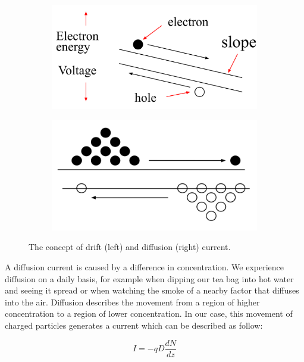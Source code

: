 \begin{figure}
\centering
\begin{subfigure}{.5\textwidth}
  \centering
  \includegraphics[width=\linewidth]{Figures/drift_current.PNG}
  \label{fig:drift_current}
\end{subfigure}%
\begin{subfigure}{.5\textwidth}
  \centering
  \includegraphics[width=\linewidth]{Figures/diffusion_current.PNG}
  \label{fig:diffusion_current}
\end{subfigure}
\caption{The concept of drift (left) and diffusion (right) current.}
\end{figure}

A diffusion current is caused by a difference in concentration. We experience diffusion on a daily basis, for example when dipping our tea bag into hot water and seeing it spread or when watching the smoke of a nearby factor that diffuses into the air. Diffusion describes the movement from a region of higher concentration to a region of lower concentration. In our case, this movement of charged particles generates a current which can be described as follow:

\begin{equation}
    I = -q D \frac{dN}{dz}
\end{equation}

